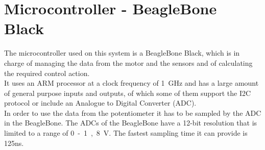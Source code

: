 \section{Microcontroller - BeagleBone Black}

The microcontroller used on this system is a BeagleBone Black, which is in charge of managing the data from the motor and the sensors and of calculating the required control action.\\
It uses an ARM processor at a clock frequency of \SI{1}{GHz} and has a large amount of general purpose inputs and outputs, of which some of them support the I2C protocol or include an Analogue to Digital Converter (ADC).\\
In order to use the data from the potentiometer it has to be sampled by the ADC in  the BeagleBone. 
The ADCs of the BeagleBone have a 12-bit resolution that is limited to a range of \si{0 - 1,8 V}. The fastest sampling time it can provide is 125ns\cite{Cameon}.